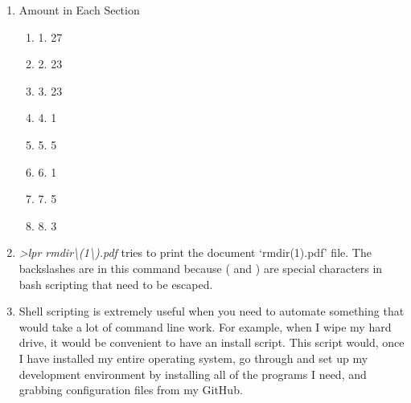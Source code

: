 \documentclass[12pt]{extarticle}
\begin{document}
\begin{enumerate}
\begin{multicols}{3}
\begin{enumerate}
					\item[] chmod 1 1 2 3 
					\item[] chown 1 1 2 3 
					\item[] stdio.h 7 
					\item[] stdlib.h 7 
					\item[] mv 1 1 
					\item[] rm 1 1 
					\item[] cp 1 1 
					\item[] bash 1 
					\item[] sh 1 1 
					\item[] zsh 1 
					\item[] env 1 1 
					\item[] lpr 1 
					\item[] intro 1 2 3 4 5 6 7 8 
					\item[] wc 1 1
				\end{enumerate}
			\end{multicols}
			\item Amount in Each Section
			\begin{multicols}{3}
				\begin{enumerate}
					\item 1. 27
					\item 2. 23
					\item 3. 23
					\item 4. 1
					\item 5. 5
					\item 6. 1
					\item 7. 5
					\item 8. 3
				\end{enumerate}
			\end{multicols}
			\item \textit{\textdollar\textgreater lpr rmdir\textbackslash(1\textbackslash).pdf} tries to print the document `rmdir(1).pdf' file.  The backslashes are in this command because ( and ) are special characters in bash scripting that need to be escaped.
			\item Shell scripting is extremely useful when you need to automate something that would take a lot of command line work.  For example, when I wipe my hard drive, it would be convenient to have an install script.  This script would, once I have installed my entire operating system, go through and set up my development environment by installing all of the programs I need, and grabbing configuration files from my GitHub.
		\end{enumerate}
\end{document}
